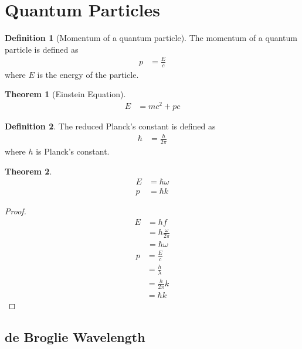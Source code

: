 \documentclass[titlepage, fleqn, a4paper, 12pt, twoside]{article}
\theoremstyle{definition}
\newtheorem{definition}{Definition}
\theoremstyle{theorem}
\newtheorem{theorem}{Theorem}
\let\Oldsection\section
\renewcommand{\section}{\FloatBarrier\Oldsection}
\let\Oldsubsection\subsection
\renewcommand{\subsection}{\FloatBarrier\Oldsubsection}
\begin{document}
\section{Quantum Particles}

\begin{definition}[Momentum of a quantum particle]
	The momentum of a quantum particle is defined as
	\begin{align*}
		p & = \frac{E}{c}
	\end{align*}
	where $E$ is the energy of the particle.
\end{definition}

\begin{theorem}[Einstein Equation]
	\begin{align*}
		E & = m c^2 + p c
	\end{align*}
	\label{Einstein_Equation}
\end{theorem}

\begin{definition}
	The reduced Planck's constant is defined as
	\begin{align*}
		\hbar & = \frac{h}{2 \pi}
	\end{align*}
	where $h$ is Planck's constant.
\end{definition}

\begin{theorem}
	\begin{align*}
		E & = \hbar \omega \\
		p & = \hbar k
	\end{align*}
\end{theorem}

\begin{proof}
	\begin{align*}
		E & = h f                    \\
                  & = h \frac{\omega}{2 \pi} \\
                  & = \hbar \omega
	\end{align*}
	\begin{align*}
		p & = \frac{E}{c}       \\
                  & = \frac{h}{\lambda} \\
                  & = \frac{h}{2 \pi} k \\
                  & = \hbar k
	\end{align*}
\end{proof}

\subsection{de Broglie Wavelength}
\end{document}
